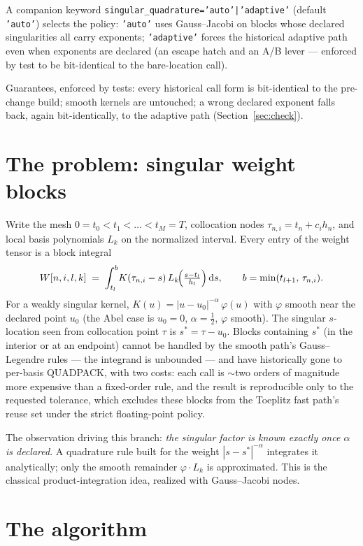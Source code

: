 \documentclass[11pt]{article}
\newcommand{\dd}{\,\mathrm{d}}
\newcommand{\kw}[1]{\texttt{#1}}
\begin{document}
A companion keyword \kw{singular\_quadrature='auto'|'adaptive'} (default
\kw{'auto'}) selects the policy: \kw{'auto'} uses Gauss--Jacobi on blocks
whose declared singularities all carry exponents; \kw{'adaptive'} forces
the historical adaptive path even when exponents are declared (an escape
hatch and an A/B lever --- enforced by test to be bit-identical to the
bare-location call).

Guarantees, enforced by tests: every historical call form is bit-identical
to the pre-change build; smooth kernels are untouched; a wrong declared
exponent falls back, again bit-identically, to the adaptive path
(Section~\ref{sec:check}).

\section{The problem: singular weight blocks}

Write the mesh $0=t_0<t_1<\dots<t_M=T$, collocation nodes
$\tau_{n,i}=t_n+c_i h_n$, and local basis polynomials $L_k$ on the
normalized interval. Every entry of the weight tensor is a block integral
\begin{equation}
  W[n,i,l,k] \;=\; \int_{t_l}^{b}\! K(\tau_{n,i}-s)\,
  L_k\!\Bigl(\tfrac{s-t_l}{h_l}\Bigr)\dd s,
  \qquad b = \min(t_{l+1},\,\tau_{n,i}).
  \label{eq:block}
\end{equation}
For a weakly singular kernel, $K(u) = |u-u_0|^{-\alpha}\,\varphi(u)$ with
$\varphi$ smooth near the declared point $u_0$ (the Abel case is $u_0=0$,
$\alpha=\tfrac12$, $\varphi$ smooth). The singular $s$-location seen from
collocation point $\tau$ is $s^\ast = \tau-u_0$. Blocks containing
$s^\ast$ (in the interior or at an endpoint) cannot be handled by the
smooth path's Gauss--Legendre rules --- the integrand is unbounded --- and
have historically gone to per-basis QUADPACK, with two costs: each call is
$\sim$two orders of magnitude more expensive than a fixed-order rule, and
the result is reproducible only to the requested tolerance, which excludes
these blocks from the Toeplitz fast path's reuse set under the strict
floating-point policy.

The observation driving this branch: \emph{the singular factor is known
exactly once $\alpha$ is declared}. A quadrature rule built for the weight
$|s-s^\ast|^{-\alpha}$ integrates it analytically; only the smooth
remainder $\varphi\cdot L_k$ is approximated. This is the classical
product-integration idea, realized with Gauss--Jacobi nodes.

\section{The algorithm}
\end{document}
